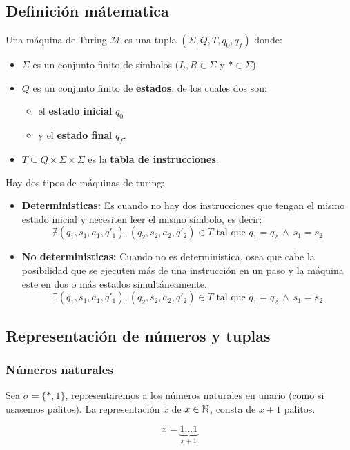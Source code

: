 	\subsection{Definición mátematica}
	Una máquina de Turing $\mathcal{M}$ es una tupla $(\Sigma, Q, T, q_0, q_f)$ donde:
	\begin{itemize}
		\item $\Sigma$ es un conjunto finito de símbolos ($L,R\in\Sigma$ y $*\in\Sigma$)
		\item $Q$ es un conjunto finito de \textbf{estados}, de los cuales dos son:
		\begin{itemize}
			\item el \textbf{estado inicial} $q_0$
			\item y el \textbf{estado fina}l $q_f$. 
		\end{itemize}
		\item $T\subseteq Q\times\Sigma\times\Sigma$ es la \textbf{tabla de instrucciones}.
	\end{itemize}

	Hay dos tipos de máquinas de turing:
	
	\begin{itemize}
		\item \textbf{Deterministicas:} Es cuando no hay dos instrucciones que tengan el mismo estado inicial y necesiten leer el mismo símbolo, es decir:
		$$\nexists (q_1,s_1,a_1,q'_1), (q_2,s_2,a_2,q'_2) \in T \text{ tal que } q_1 = q_2~\land~s_1 = s_2$$
		\item\textbf{No deterministicas:} Cuando no es deterministica, osea que cabe la posibilidad que se ejecuten más de una instrucción en un paso y la máquina este en dos o más estados simultáneamente. 
		$$\exists (q_1,s_1,a_1,q'_1), (q_2,s_2,a_2,q'_2) \in T \text{ tal que } q_1 = q_2~\land~s_1 = s_2$$
	\end{itemize}

	\subsection{Representación de números y tuplas}
	\subsubsection{Números naturales}
	Sea $\sigma=\{*, 1\}$, representaremos a los números naturales en unario (como si usasemos palitos). La representación $\bar{x}$ de $x\in\mathbb{N}$, consta de $x+1$ palitos.
	
	$$\bar{x} = \underbrace{1...1}_{x+1}$$
	
